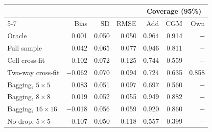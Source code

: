 \begin{tabular}{lrrrrrr}
\toprule
 & \multicolumn{3}{c}{} & \multicolumn{3}{c}{Coverage (95\%)} \\ \cmidrule(lr){5-7}
 & Bias & SD & RMSE & Add & CGM & Own \\
\midrule
Oracle & 0.001 & 0.050 & 0.050 & 0.964 & 0.914 & $-$ \\
Full sample & 0.042 & 0.065 & 0.077 & 0.946 & 0.811 & $-$ \\
Cell cross-fit & 0.102 & 0.072 & 0.125 & 0.744 & 0.559 & $-$ \\
Two-way cross-fit & $-$0.062 & 0.070 & 0.094 & 0.724 & 0.635 & 0.858 \\
Bagging, $5\times5$ & 0.083 & 0.051 & 0.097 & 0.697 & 0.560 & $-$ \\
Bagging, $8\times8$ & 0.019 & 0.052 & 0.055 & 0.949 & 0.882 & $-$ \\
Bagging, $16\times16$ & $-$0.018 & 0.056 & 0.059 & 0.920 & 0.860 & $-$ \\
No-drop, $5\times5$ & 0.107 & 0.050 & 0.118 & 0.557 & 0.399 & $-$ \\
\bottomrule
\end{tabular}
